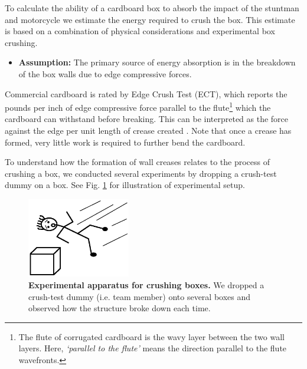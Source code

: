 \documentclass[12pt,a4paper,titlepage]{article}
\begin{document}
To calculate the ability of a cardboard box to absorb the impact of the stuntman and motorcycle we
estimate the energy required to crush the box.  This estimate is based on a combination of physical
considerations and experimental box crushing.

\begin{itemize}
\item  {\bf Assumption:} The primary source of energy absorption
is in the breakdown of the box walls due to edge compressive forces.
\end{itemize}

Commercial cardboard is rated by Edge Crush Test (ECT), which reports the pounds per inch of edge compressive force
parallel to the flute\footnote{The flute of corrugated cardboard is the wavy layer between the two wall
layers.  Here, {\it `parallel to the flute'} means the direction parallel to the flute wavefronts.}
which the cardboard can withstand before breaking.  This can be
interpreted as the force against the edge per unit length of crease created \cite{torhexpaper,4corrugated}.
Note that once a crease has formed, very little work is required to further bend the cardboard.

To understand how the formation of wall creases relates to the process of crushing a box, we conducted several
experiments by dropping a crush-test dummy on a box.  See Fig. \ref{fall} for illustration of experimental setup.

\begin{figure}
\caption{\label{fall} {\bf Experimental apparatus for crushing boxes.}  We dropped a crush-test dummy
(i.e. team member) onto several boxes and observed how the  structure broke down each time.}
\begin{center}
\includegraphics[width=0.4\textwidth]{fall4.eps}
\end{center}
\end{figure}
\end{document}
